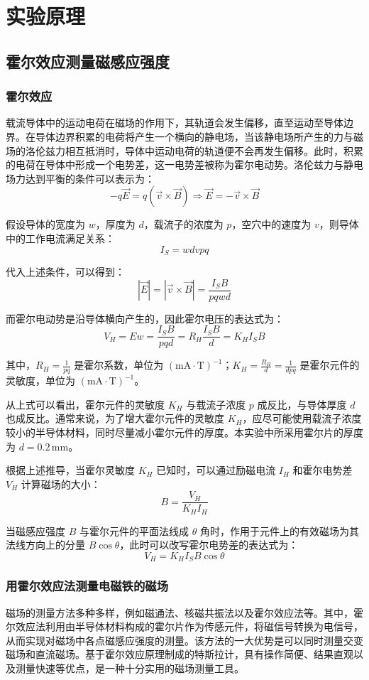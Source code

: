 \documentclass[UTF-8,twoside,cs4size]{ctexart}
\begin{document}
\section{实验原理}
\subsection{霍尔效应测量磁感应强度}
\subsubsection{霍尔效应}
载流导体中的运动电荷在磁场的作用下，其轨道会发生偏移，直至运动至导体边界。在导体边界积累的电荷将产生一个横向的静电场，当该静电场所产生的力与磁场的洛伦兹力相互抵消时，导体中运动电荷的轨道便不会再发生偏移。此时，积累的电荷在导体中形成一个电势差，这一电势差被称为霍尔电动势。洛伦兹力与静电场力达到平衡的条件可以表示为：
\[
- q\vec{E} = q(\vec{v} \times \vec{B}) \Rightarrow \vec{E} = - \vec{v} \times \vec{B}
\]

假设导体的宽度为 $w$，厚度为 $d$，载流子的浓度为 $p$，空穴中的速度为 $v$，则导体中的工作电流满足关系：
\[
I_S = w d v p q
\]

代入上述条件，可以得到：
\[
\left| \vec{E} \right| = \left| \vec{v} \times \vec{B} \right| = \frac{I_S B}{p q w d}
\]

而霍尔电动势是沿导体横向产生的，因此霍尔电压的表达式为：
\[
V_H = E w = \frac{I_S B}{p q d} = R_H \frac{I_S B}{d} = K_H I_S B
\]

其中，$R_H = \frac{1}{p q}$ 是霍尔系数，单位为 $\mathrm{(mA \cdot T)^{-1}}$；$K_H = \frac{R_H}{d} = \frac{1}{d p q}$ 是霍尔元件的灵敏度，单位为 $\mathrm{(mA \cdot T)^{-1}}$。

从上式可以看出，霍尔元件的灵敏度 $K_H$ 与载流子浓度 $p$ 成反比，与导体厚度 $d$ 也成反比。通常来说，为了增大霍尔元件的灵敏度 $K_H$，应尽可能使用载流子浓度较小的半导体材料，同时尽量减小霍尔元件的厚度。本实验中所采用霍尔片的厚度为 $d = 0.2 \, \mathrm{mm}$。 \par

根据上述推导，当霍尔灵敏度 $K_H$ 已知时，可以通过励磁电流 $I_H$ 和霍尔电势差 $V_H$ 计算磁场的大小：
\[
B = \frac{V_H}{K_H I_H}
\]

当磁感应强度 $B$ 与霍尔元件的平面法线成 $\theta$ 角时，作用于元件上的有效磁场为其法线方向上的分量 $B \cos\theta$，此时可以改写霍尔电势差的表达式为：
\[
V_H = K_H I_S B \cos\theta
\]
\subsubsection{用霍尔效应法测量电磁铁的磁场}
磁场的测量方法多种多样，例如磁通法、核磁共振法以及霍尔效应法等。其中，霍尔效应法利用由半导体材料构成的霍尔片作为传感元件，将磁信号转换为电信号，从而实现对磁场中各点磁感应强度的测量。该方法的一大优势是可以同时测量交变磁场和直流磁场。基于霍尔效应原理制成的特斯拉计，具有操作简便、结果直观以及测量快速等优点，是一种十分实用的磁场测量工具。 \par
\end{document}
